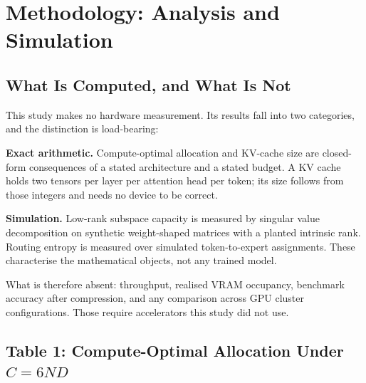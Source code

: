 \documentclass[11pt,a4paper]{article}
\begin{document}
\section{Methodology: Analysis and Simulation}



\subsection{What Is Computed, and What Is Not}


This study makes no hardware measurement. Its results fall into two categories, and the distinction is load-bearing:

\textbf{Exact arithmetic.} Compute-optimal allocation and KV-cache size are closed-form consequences of a stated architecture and a stated budget. A KV cache holds two tensors per layer per attention head per token; its size follows from those integers and needs no device to be correct.

\textbf{Simulation.} Low-rank subspace capacity is measured by singular value decomposition on synthetic weight-shaped matrices with a planted intrinsic rank. Routing entropy is measured over simulated token-to-expert assignments. These characterise the mathematical objects, not any trained model.

What is therefore absent: throughput, realised VRAM occupancy, benchmark accuracy after compression, and any comparison across GPU cluster configurations. Those require accelerators this study did not use.


\subsection{Table 1: Compute-Optimal Allocation Under $C = 6ND$}
\begin{table}[htbp]
\centering
{}
\end{table}
\end{document}
